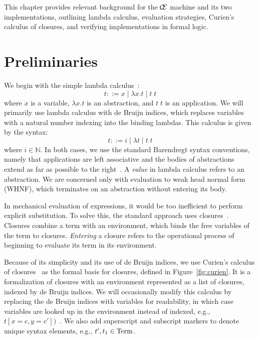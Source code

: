 This chapter provides relevant background for the $\mathcal{\mathcal{C} \mskip
-4mu \mathcal{E}}$ machine and its two implementations, outlining lambda
calculus, evaluation strategies, Curien's calculus of closures, and verifying
implementations in formal logic. 

\section{Preliminaries} \label{sec:prelim}

We begin with the simple lambda calculus~\cite{barendregt1984lambda}:  $$ t::= x
\; | \;  \lambda x.t \; | \;  t \; t $$ where $x$ is a variable, $\lambda x.t$
is an abstraction, and $t \; t$ is an application. We will primarily use lambda
calculus with de Bruijn indices, which replaces variables with a natural number
indexing into the binding lambdas.  This calculus is given by the syntax: $$
t::= i \; | \; \lambda t \; | \; t \; t $$ where $i \in \mathbb{N}$. In both
cases, we use the standard Barendregt syntax conventions, namely that
applications are left associative and the bodies of abstractions extend as far
as possible to the right~\cite{barendregt1984lambda}.  A \emph{value} in lambda
calculus refers to an abstraction. We are concerned only with evaluation to weak
head normal form (WHNF), which terminates on an abstraction without entering its
body.

In mechanical evaluation of expressions, it would be too inefficient to perform
explicit substitution. To solve this, the standard approach uses
closures~\cite{landin1964mechanical,curien1991abstract,jonesstg,biernacka2007concrete}.
Closures combine a term with an environment, which binds the free variables of
the term to closures. \emph{Entering} a closure refers to the operational
process of beginning to evaluate its term in its environment.

Because of its simplicity and its use of de Bruijn indices, we use Curien's
calculus of closures~\cite{curien1991abstract} as the formal basis for closures,
defined in Figure~\ref{fig:curien}. It is a formalization of closures with an
environment represented as a list of closures, indexed by de Bruijn indices. We
will occasionally modify this calculus by replacing the de Bruijn indices with
variables for readability, in which case variables are looked up in the
environment instead of indexed, e.g., $t[x = c, y =
c'])$~\cite{barendregt1984lambda}. We also add superscript and subscript markers
to denote unique syntax elements, e.g., $t', t_1 \in \textnormal{Term}$. 

